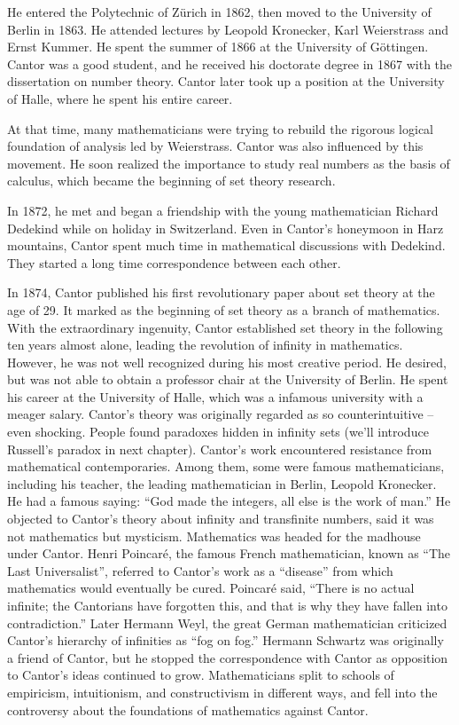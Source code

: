 \documentclass{article}
\begin{document}
He entered the Polytechnic of Zürich in 1862, then moved to the University of Berlin in 1863. He attended lectures by Leopold Kronecker, Karl Weierstrass and Ernst Kummer. He spent the summer of 1866 at the University of Göttingen. Cantor was a good student, and he received his doctorate degree in 1867 with the dissertation on number theory. Cantor later took up a position at the University of Halle, where he spent his entire career.

At that time, many mathematicians were trying to rebuild the rigorous logical foundation of analysis led by Weierstrass. Cantor was also influenced by this movement. He soon realized the importance to study real numbers as the basis of calculus, which became the beginning of set theory research.

In 1872, he met and began a friendship with the young mathematician Richard Dedekind while on holiday in Switzerland. Even in Cantor's honeymoon in Harz mountains, Cantor spent much time in mathematical discussions with Dedekind. They started a long time correspondence between each other.

In 1874, Cantor published his first revolutionary paper about set theory at the age of 29. It marked as the beginning of set theory as a branch of mathematics. With the extraordinary ingenuity, Cantor established set theory in the following ten years almost alone, leading the revolution of infinity in mathematics. However, he was not well recognized during his most creative period. He desired, but was not able to obtain a professor chair at the University of Berlin. He spent his career at the University of Halle, which was a infamous university with a meager salary. Cantor's theory was originally regarded as so counterintuitive – even shocking. People found paradoxes hidden in infinity sets (we'll introduce Russell's paradox in next chapter). Cantor's work encountered resistance from mathematical contemporaries. Among them, some were famous mathematicians, including his teacher, the leading mathematician in Berlin, Leopold Kronecker. He had a famous saying: ``God made the integers, all else is the work of man.'' He objected to Cantor's theory about infinity and transfinite numbers, said it was not mathematics but mysticism. Mathematics was headed for the madhouse under Cantor. Henri Poincaré, the famous French mathematician, known as ``The Last Universalist'', referred to Cantor's work as a ``disease'' from which mathematics would eventually be cured. Poincaré said, ``There is no actual infinite; the Cantorians have forgotten this, and that is why they have fallen into contradiction.'' Later Hermann Weyl, the great German mathematician criticized Cantor's hierarchy of infinities as ``fog on fog.'' Hermann Schwartz was originally a friend of Cantor, but he stopped the correspondence with Cantor as opposition to Cantor's ideas continued to grow. Mathematicians split to schools of empiricism, intuitionism, and constructivism in different ways, and fell into the controversy about the foundations of mathematics against Cantor.
\end{document}
